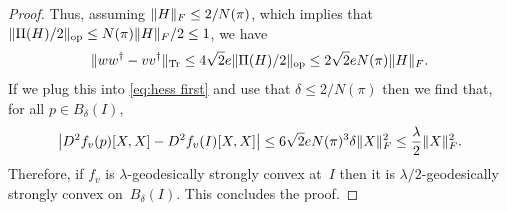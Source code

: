 \documentclass{article}
\DeclareMathOperator{\ope}{op}
\DeclarePairedDelimiter{\abs}{\lvert}{\rvert}
\DeclarePairedDelimiter{\norm}{\lVert}{\rVert}
\newcommand\tr{\operatorname{Tr}}
\begin{document}
\begin{proof}
Thus, assuming $\norm{H}_F \leq 2 / N(\pi)$, which implies that $\norm{\Pi(H)/2}_{\ope} \leq N(\pi) \norm{H}_F / 2 \leq 1$, we have
\begin{align*}
  \norm{ww^\dagger - vv^\dagger}_{\tr}
\leq 4 \sqrt2 e \norm{\Pi(H)/2}_{\ope}
\leq 2 \sqrt2 e N(\pi) \norm{H}_F.
\end{align*}
If we plug this into \cref{eq:hess first} and use that $\delta \leq 2/N(\pi)$ then we find that, for all $p \in B_\delta(I)$,
\begin{align*}
  \abs[\big]{D^2f_v(p)[X,X] - D^2f_v(I)[X,X]}
\leq 6\sqrt{2} e N(\pi)^3 \delta \norm{X}_F^2
\leq \frac\lambda2 \norm{X}_F^2.
\end{align*}
Therefore, if $f_v$ is $\lambda$-geodesically strongly convex at~$I$ then it is $\lambda/2$-geodesically strongly convex on~$B_\delta(I)$.
This concludes the proof.
\end{proof}













\end{document}
